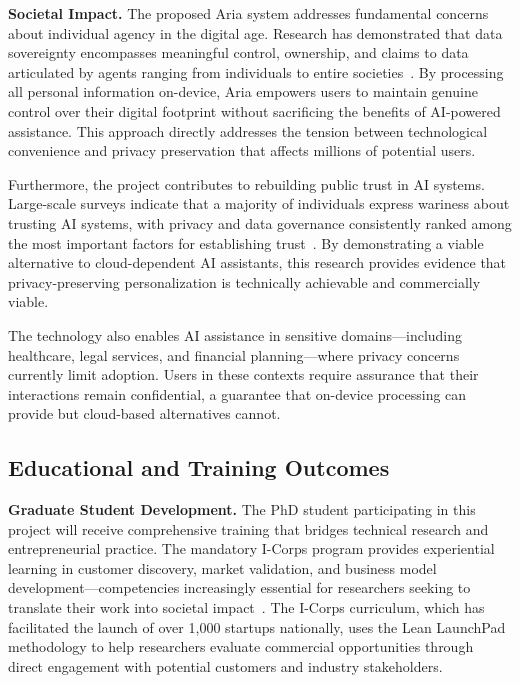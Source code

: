\documentclass[11pt]{article}
\begin{document}
\textbf{Societal Impact.}
The proposed Aria system addresses fundamental concerns about individual agency 
in the digital age. Research has demonstrated that data sovereignty encompasses 
meaningful control, ownership, and claims to data articulated by agents ranging 
from individuals to entire societies~\cite{hummel2021data}. By processing all 
personal information on-device, Aria empowers users to maintain genuine control 
over their digital footprint without sacrificing the benefits of AI-powered 
assistance. This approach directly addresses the tension between technological 
convenience and privacy preservation that affects millions of potential users.

Furthermore, the project contributes to rebuilding public trust in AI systems. 
Large-scale surveys indicate that a majority of individuals express wariness 
about trusting AI systems, with privacy and data governance consistently ranked 
among the most important factors for establishing trust~\cite{gillespie2023trust}. 
By demonstrating a viable alternative to cloud-dependent AI assistants, this 
research provides evidence that privacy-preserving personalization is technically 
achievable and commercially viable.

The technology also enables AI assistance in sensitive domains---including 
healthcare, legal services, and financial planning---where privacy concerns 
currently limit adoption. Users in these contexts require assurance that their 
interactions remain confidential, a guarantee that on-device processing can 
provide but cloud-based alternatives cannot.

\vspace*{-8pt}
\subsection{Educational and Training Outcomes}
\vspace*{-8pt}
\textbf{Graduate Student Development.}
The PhD student participating in this project will receive comprehensive 
training that bridges technical research and entrepreneurial practice. The 
mandatory I-Corps program provides experiential learning in customer discovery, 
market validation, and business model development---competencies increasingly 
essential for researchers seeking to translate their work into societal 
impact~\cite{duval2020training}. The I-Corps curriculum, which has facilitated 
the launch of over 1,000 startups nationally, uses the Lean LaunchPad methodology 
to help researchers evaluate commercial opportunities through direct engagement 
with potential customers and industry stakeholders.
\end{document}
